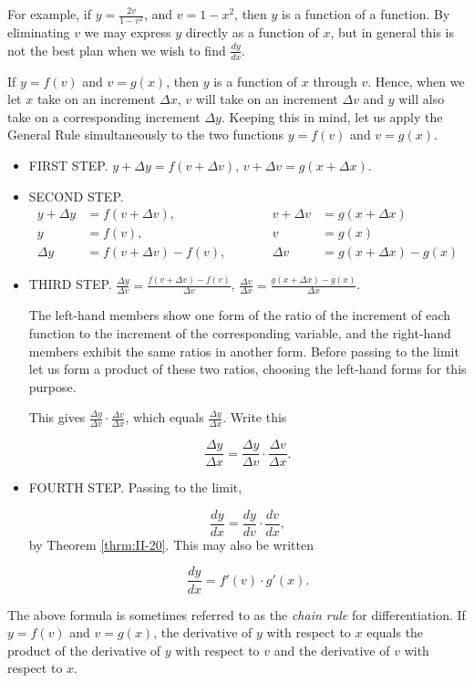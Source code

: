 For example, if $y = \frac{2v}{1 - v^2}$,
and $v = 1-x^2$,
then $y$ is a function of a function. By eliminating $v$ we may express 
$y$ directly as a function of $x$, but in general this is not the best plan when 
we wish to find $\frac{dy}{dx}$.

If $y = f(v)$ and $v = g (x)$, then $y$ is a function of $x$ through $v$. 
Hence, when we let $x$ take on an increment $\Delta x$, $v$ will take on an increment 
$\Delta v$ and $y$ will also take on a corresponding increment $\Delta y$. 
Keeping this in mind, let us apply the General Rule simultaneously 
to the two functions $y = f(v)$ and $v = g (x)$.

\begin{itemize}
\item
FIRST STEP. $	y + \Delta y 	= f(v + \Delta v)$, $v + \Delta v = g(x + \Delta x)$.

\item
SECOND STEP.
\[
\begin{array}{rlcrl}
y + \Delta y &	= f(v + \Delta v), & \qquad &	v + \Delta v &	= g (x + \Delta x)\\
y 	&= f(v), & \qquad &	v &	= g (x)\\
\Delta y 	&=f(v + \Delta v) - f(v),  & \qquad &	\Delta v &=g (x + \Delta x) - g (x)
\end{array}
\]

\item
THIRD STEP. $	\frac{\Delta y}{\Delta v} 	
= \frac{f(v + \Delta v) - f(v)}{\Delta v} $,
$\frac{\Delta v}{\Delta x} =	\frac{g(x + \Delta x) - g(x)}{\Delta x}$.

The left-hand members show one form of the ratio of the increment of 
each function to the increment of the corresponding variable, and the right-hand 
members exhibit the same ratios in another form. Before passing to the limit 
let us form a product of these two ratios, choosing the left-hand forms for this purpose.

This gives $\frac{\Delta y}{\Delta v} \cdot \frac{\Delta v}{\Delta x}$, 
which equals $\frac{\Delta y}{\Delta x}$.
Write this 	

\[
\frac{\Delta y}{\Delta x} 	= \frac{\Delta y}{\Delta v} \cdot \frac{\Delta v}{\Delta x}.
\]

\item
FOURTH STEP. Passing to the limit,

\begin{equation}
\frac{dy}{dx} 	= \frac{dy}{dv} \cdot \frac{dv}{dx},
\label{eqn:A-42}
\end{equation}
by Theorem \ref{thrm:II-20}.%
This may also be written

\[
	\frac{dy}{dx} 	= f'(v) \cdot g'(x).
\]

\end{itemize}
The above formula is sometimes referred to as the {\it chain rule} 
for differentiation. %
If $y = f(v)$ and $v = g(x)$, the derivative of $y$ with respect to $x$ equals 
the product of the derivative of $y$ with respect to $v$ and the derivative of 
$v$ with respect to $x$.

